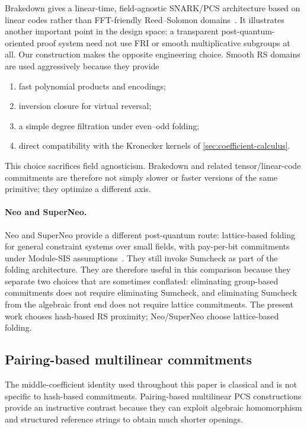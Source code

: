 Brakedown gives a linear-time, field-agnostic SNARK/PCS architecture based on linear codes rather than FFT-friendly Reed--Solomon domains~\cite{Brakedown23}.  It illustrates another important point in the design space: a transparent post-quantum-oriented proof system need not use FRI or smooth multiplicative subgroups at all.  Our construction makes the opposite engineering choice.  Smooth RS domains are used aggressively because they provide
\begin{enumerate}[label=(\roman*),leftmargin=*]
  \item fast polynomial products and encodings;
  \item inversion closure for virtual reversal;
  \item a simple degree filtration under even--odd folding;
  \item direct compatibility with the Kronecker kernels of \cref{sec:coefficient-calculus}.
\end{enumerate}
This choice sacrifices field agnosticism.  Brakedown and related tensor/linear-code commitments are therefore not simply slower or faster versions of the same primitive; they optimize a different axis.


\paragraph{Neo and SuperNeo.}
Neo and SuperNeo provide a different post-quantum route: lattice-based folding for general constraint systems over small fields, with pay-per-bit commitments under Module-SIS assumptions~\cite{NeoSuperNeo26}.  They still invoke Sumcheck as part of the folding architecture.  They are therefore useful in this comparison because they separate two choices that are sometimes conflated: eliminating group-based commitments does not require eliminating Sumcheck, and eliminating Sumcheck from the algebraic front end does not require lattice commitments.  The present work chooses hash-based RS proximity; Neo/SuperNeo choose lattice-based folding.

\subsection{Pairing-based multilinear commitments}
\label{sec:comparison-pairing}

The middle-coefficient identity used throughout this paper is classical and is not specific to hash-based commitments.  Pairing-based multilinear PCS constructions provide an instructive contrast because they can exploit algebraic homomorphism and structured reference strings to obtain much shorter openings.

